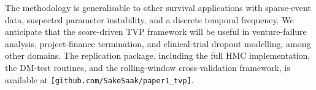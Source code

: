 \documentclass[12pt,a4paper]{article}
\theoremstyle{plain}
\theoremstyle{definition}
\begin{document}
The methodology is generalisable to other survival applications with sparse-event data, suspected parameter instability, and a discrete temporal frequency. We anticipate that the score-driven TVP framework will be useful in venture-failure analysis, project-finance termination, and clinical-trial dropout modelling, among other domains. The replication package, including the full HMC implementation, the DM-test routines, and the rolling-window cross-validation framework, is available at \texttt{[github.com/SakeSaak/paper1\_tvp]}.



\end{document}
